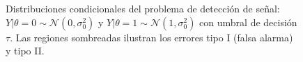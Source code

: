\documentclass[
  11pt,
  letterpaper,
   addpoints,
  answers
  ]{exam}
\begin{document}
\begin{questions}
\begin{solution}
\begin{figure}[H]
\begin{tikzpicture}[scale=1.2]
  \end{tikzpicture}
  \caption{Distribuciones condicionales del problema de detección de señal: $Y|\theta=0 \sim \mathcal{N}(0, \sigma_0^2)$ y $Y|\theta=1 \sim \mathcal{N}(1, \sigma_0^2)$ con umbral de decisión $\tau$. Las regiones sombreadas ilustran los errores tipo I (falsa alarma) y tipo II.}
  \label{fig:canal_comunicacion}
  \end{figure}
\end{solution}
%
%    
%    

\end{questions}
\end{document}
